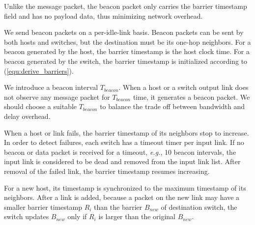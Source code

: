Unlike the message packet, the beacon packet only carries the barrier timestamp field and has no payload data, thus minimizing network overhead. 

We send beacon packets on a per-idle-link basis.
Beacon packets can be sent by both hosts and switches,
but the destination must be its one-hop neighbors. For a beacon generated by the host, the barrier timestamp is the host clock time. For a beacon generated by the switch, the barrier timestamp is initialized according to (\ref{equ:derive_barriers}).

We introduce a beacon interval $T_{beacon}$. When a host or a switch output link does not observe any message packet for $T_{beacon}$ time, it generates a beacon packet. We should choose a suitable $T_{beacon}$ to balance the trade off between bandwidth and delay overhead. %

When a host or link fails, the barrier timestamp of its neighbors stop to increase. 
In order to detect failures, each switch has a timeout timer per input link. If no beacon or data packet is received for a timeout, \textit{e.g.}, 10 beacon intervals, the input link is considered to be dead and removed from the input link list.
After removal of the failed link, the barrier timestamp resumes increasing.

For a new host, its timestamp is synchronized to the maximum timestamp of its neighbors. After a link is added, because a packet on the new link may have a smaller barrier timestamp $R_i$ than the barrier $B_{new}$ of destination switch, the switch updates $B_{new}$ only if $R_i$ is larger than the original $B_{new}$.




